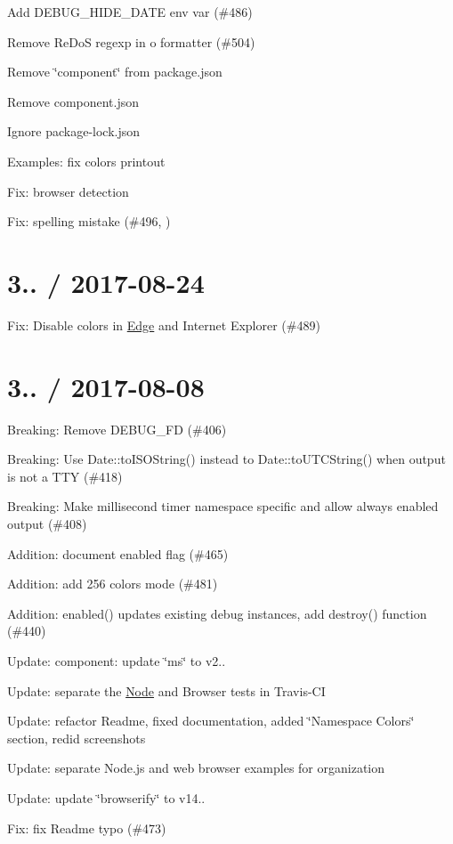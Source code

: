 
\begin{DoxyItemize}
\item Add {\ttfamily D\+E\+B\+U\+G\+\_\+\+H\+I\+D\+E\+\_\+\+D\+A\+TE} env var (\#486)
\item Remove Re\+DoS regexp in o formatter (\#504)
\item Remove \char`\"{}component\char`\"{} from package.\+json
\item Remove {\ttfamily component.\+json}
\item Ignore package-\/lock.\+json
\item Examples\+: fix colors printout
\item Fix\+: browser detection
\item Fix\+: spelling mistake (\#496, )
\end{DoxyItemize}

\section*{3.. / 2017-\/08-\/24 }


\begin{DoxyItemize}
\item Fix\+: Disable colors in \mbox{\hyperlink{classEdge}{Edge}} and Internet Explorer (\#489)
\end{DoxyItemize}

\section*{3.. / 2017-\/08-\/08 }


\begin{DoxyItemize}
\item Breaking\+: Remove D\+E\+B\+U\+G\+\_\+\+FD (\#406)
\item Breaking\+: Use {\ttfamily Date\+::to\+I\+S\+O\+String()} instead to {\ttfamily Date\+::to\+U\+T\+C\+String()} when output is not a T\+TY (\#418)
\item Breaking\+: Make millisecond timer namespace specific and allow \textquotesingle{}always enabled\textquotesingle{} output (\#408)
\item Addition\+: document {\ttfamily enabled} flag (\#465)
\item Addition\+: add 256 colors mode (\#481)
\item Addition\+: {\ttfamily enabled()} updates existing debug instances, add {\ttfamily destroy()} function (\#440)
\item Update\+: component\+: update \char`\"{}ms\char`\"{} to v2..
\item Update\+: separate the \mbox{\hyperlink{classNode}{Node}} and Browser tests in Travis-\/\+CI
\item Update\+: refactor Readme, fixed documentation, added \char`\"{}\+Namespace Colors\char`\"{} section, redid screenshots
\item Update\+: separate Node.\+js and web browser examples for organization
\item Update\+: update \char`\"{}browserify\char`\"{} to v14..
\item Fix\+: fix Readme typo (\#473)
\end{DoxyItemize}

